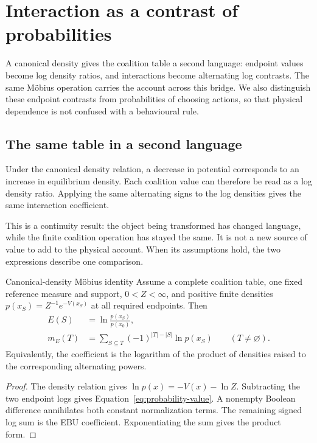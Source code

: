 \chapter{Interaction as a contrast of probabilities}\label{ch:probability-interactions}

A canonical density gives the coalition table a second language: endpoint values become log density ratios, and interactions become alternating log contrasts. The same Möbius operation carries the account across this bridge. We also distinguish these endpoint contrasts from probabilities of choosing actions, so that physical dependence is not confused with a behavioural rule.


\section{The same table in a second language}
Under the canonical density relation, a decrease in potential corresponds to an increase in equilibrium density. Each coalition value can therefore be read as a log density ratio. Applying the same alternating signs to the log densities gives the same interaction coefficient.

This is a continuity result: the object being transformed has changed language, while the finite coalition operation has stayed the same. It is not a new source of value to add to the physical account. When its assumptions hold, the two expressions describe one comparison.

\begin{theorem}{Canonical-density Möbius identity}\label{thm:probability-mobius}
Assume a complete coalition table, one fixed reference measure and support, $0<Z<\infty$, and positive finite densities $p(x_S)=Z^{-1}e^{-V(x_S)}$ at all required endpoints. Then
\begin{align}\label{eq:probability-value}
 E(S)&=\ln\frac{p(x_S)}{p(x_0)},\\
 m_E(T)&=\sum_{S\subseteq T}(-1)^{|T|-|S|}\ln p(x_S)
 \qquad(T\ne\varnothing).\label{eq:probability-mobius}
\end{align}
Equivalently, the coefficient is the logarithm of the product of densities raised to the corresponding alternating powers.
\end{theorem}
\begin{proof}
The density relation gives $\ln p(x)=-V(x)-\ln Z$. Subtracting the two endpoint logs gives Equation~\ref{eq:probability-value}. A nonempty Boolean difference annihilates both constant normalization terms. The remaining signed log sum is the EBU coefficient. Exponentiating the sum gives the product form.
\end{proof}

